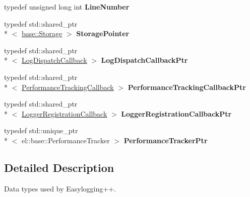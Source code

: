\begin{DoxyCompactItemize}
\item 
\hypertarget{namespaceel_1_1base_1_1type_a7be44abab4288b1ea29962a059737347}{typedef unsigned long int {\bfseries Line\-Number}}\label{namespaceel_1_1base_1_1type_a7be44abab4288b1ea29962a059737347}

\item 
\hypertarget{namespaceel_1_1base_1_1type_a3c34822c3825018aca1526f2289b7976}{typedef std\-::shared\-\_\-ptr\\*
$<$ \hyperlink{classel_1_1base_1_1Storage}{base\-::\-Storage} $>$ {\bfseries Storage\-Pointer}}\label{namespaceel_1_1base_1_1type_a3c34822c3825018aca1526f2289b7976}

\item 
\hypertarget{namespaceel_1_1base_1_1type_a887283511935c7a6d5ca99df8099f33f}{typedef std\-::shared\-\_\-ptr\\*
$<$ \hyperlink{classel_1_1LogDispatchCallback}{Log\-Dispatch\-Callback} $>$ {\bfseries Log\-Dispatch\-Callback\-Ptr}}\label{namespaceel_1_1base_1_1type_a887283511935c7a6d5ca99df8099f33f}

\item 
\hypertarget{namespaceel_1_1base_1_1type_a01a715419060d65c31b71fd8d067abdd}{typedef std\-::shared\-\_\-ptr\\*
$<$ \hyperlink{classel_1_1PerformanceTrackingCallback}{Performance\-Tracking\-Callback} $>$ {\bfseries Performance\-Tracking\-Callback\-Ptr}}\label{namespaceel_1_1base_1_1type_a01a715419060d65c31b71fd8d067abdd}

\item 
\hypertarget{namespaceel_1_1base_1_1type_ab9e009b0511ba22eed263c8ced700bb6}{typedef std\-::shared\-\_\-ptr\\*
$<$ \hyperlink{classel_1_1LoggerRegistrationCallback}{Logger\-Registration\-Callback} $>$ {\bfseries Logger\-Registration\-Callback\-Ptr}}\label{namespaceel_1_1base_1_1type_ab9e009b0511ba22eed263c8ced700bb6}

\item 
\hypertarget{namespaceel_1_1base_1_1type_a095751e8dd68ae28d07a548f47d31d31}{typedef std\-::unique\-\_\-ptr\\*
$<$ el\-::base\-::\-Performance\-Tracker $>$ {\bfseries Performance\-Tracker\-Ptr}}\label{namespaceel_1_1base_1_1type_a095751e8dd68ae28d07a548f47d31d31}

\end{DoxyCompactItemize}


\subsection{Detailed Description}
Data types used by Easylogging++. 